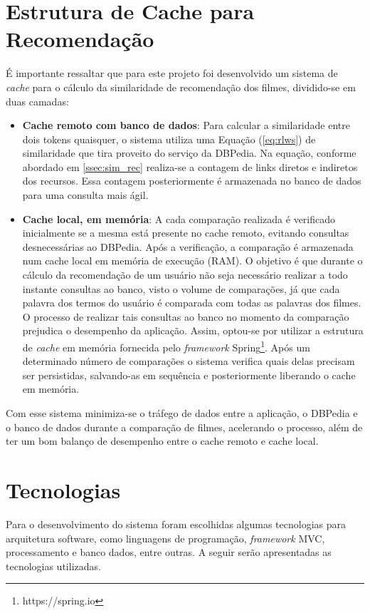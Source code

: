 \section{Estrutura de Cache para Recomendação}
\label{sec:cache}

É importante ressaltar que para este projeto foi desenvolvido um sistema de \textit{cache} para o cálculo da similaridade de recomendação dos filmes, dividido-se em duas camadas:

\begin{itemize}
	\item{\textbf{Cache remoto com banco de dados}: Para calcular a similaridade entre dois tokens quaisquer, o sistema utiliza uma Equação (\ref{eq:rlws}) de similaridade que tira proveito do serviço da DBPedia. Na equação, conforme abordado em \ref{ssec:sim_rec} realiza-se a contagem de links diretos e indiretos dos recursos. Essa contagem posteriormente é armazenada no banco de dados para uma consulta mais ágil.}
	\item{\textbf{Cache local, em memória}: A cada comparação realizada é verificado inicialmente se a mesma está presente no cache remoto, evitando consultas desnecessárias ao DBPedia. Após a verificação, a comparação é armazenada num cache local em memória de execução (\ac{RAM}). O objetivo é que durante o cálculo da recomendação de um usuário não seja necessário realizar a todo instante consultas ao banco, visto o volume de comparações, já que cada palavra dos termos do usuário é comparada com todas as palavras dos filmes. O processo de realizar tais consultas ao banco no momento da comparação prejudica o desempenho da aplicação. Assim, optou-se por utilizar a estrutura de \textit{cache} em memória fornecida pelo \textit{framework} Spring\footnote{https://spring.io}. Após um determinado número de comparações o sistema verifica quais delas precisam ser persistidas, salvando-as em sequência e posteriormente liberando o cache em memória.}
\end{itemize}

Com esse sistema minimiza-se o tráfego de dados entre a aplicação, o DBPedia e o banco de dados durante a comparação de filmes, acelerando o processo, além de ter um bom balanço de desempenho entre o cache remoto e cache local.

\section{Tecnologias}

Para o desenvolvimento do sistema foram escolhidas algumas tecnologias para arquitetura software, como linguagens de programação, \textit{framework} \ac{MVC}, processamento e banco dados, entre outras. A seguir serão apresentadas as tecnologias utilizadas.

